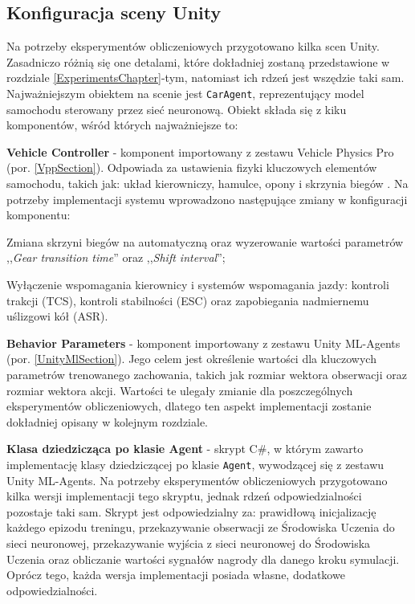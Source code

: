 \subsection{Konfiguracja sceny Unity}
Na potrzeby eksperymentów obliczeniowych przygotowano kilka scen Unity. Zasadniczo różnią się one detalami, które dokładniej zostaną przedstawione w rozdziale \ref{ExperimentsChapter}-tym, natomiast ich rdzeń jest wszędzie taki sam. Najważniejszym obiektem na scenie jest \texttt{CarAgent}, reprezentujący model samochodu sterowany przez sieć neuronową. Obiekt składa się z kiku komponentów, wśród których najważniejsze to:
\vspace{-0.5cm}
\begin{enumerate*}
\item \textbf{Vehicle Controller} - komponent importowany z zestawu Vehicle Physics Pro (por. \ref{VppSection}). Odpowiada za ustawienia fizyki kluczowych elementów samochodu, takich jak: układ kierowniczy, hamulce, opony i skrzynia biegów \cite{vpp:vehicleController}. Na potrzeby implementacji systemu wprowadzono następujące zmiany w konfiguracji komponentu:
\begin{itemize*}
\item Zmiana skrzyni biegów na automatyczną oraz wyzerowanie wartości parametrów ,,\textit{Gear transition time}'' oraz ,,\textit{Shift interval}'';
\item Wyłączenie wspomagania kierownicy i systemów wspomagania jazdy: kontroli trakcji (TCS), kontroli stabilności (ESC) oraz zapobiegania nadmiernemu uślizgowi kół (ASR).
\end{itemize*}
\item \textbf{Behavior Parameters} - komponent importowany z zestawu Unity ML-Agents (por. \ref{UnityMlSection}). Jego celem jest określenie wartości dla kluczowych parametrów trenowanego zachowania, takich jak rozmiar wektora obserwacji oraz rozmiar wektora akcji. Wartości te ulegały zmianie dla poszczególnych eksperymentów obliczeniowych, dlatego ten aspekt implementacji zostanie dokładniej opisany w kolejnym rozdziale.
\item \textbf{Klasa dziedzicząca po klasie Agent} - skrypt C\#, w którym zawarto implementację klasy dziedziczącej po klasie \texttt{Agent}, wywodzącej się z zestawu Unity ML-Agents. Na potrzeby eksperymentów obliczeniowych przygotowano kilka wersji implementacji tego skryptu, jednak rdzeń odpowiedzialności pozostaje taki sam. Skrypt jest odpowiedzialny za: prawidłową inicjalizację każdego epizodu treningu, przekazywanie obserwacji ze Środowiska Uczenia do sieci neuronowej, przekazywanie wyjścia z sieci neuronowej do Środowiska Uczenia oraz obliczanie wartości sygnałów nagrody dla danego kroku symulacji. Oprócz tego, każda wersja implementacji posiada własne, dodatkowe odpowiedzialności.

\end{enumerate*}
